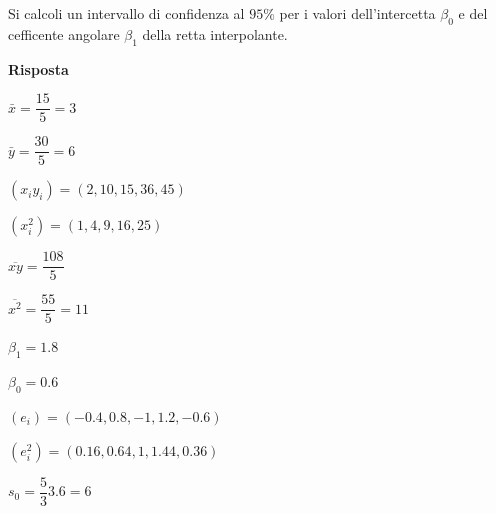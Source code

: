 \documentclass[11pt,openany]{book}
\begin{document}
Si calcoli un intervallo di confidenza al $95\%$ per i valori dell'intercetta $\beta_0$ e del cefficente angolare $\beta_1$ della retta interpolante.

\textbf{Risposta}

$\bar x=\dfrac{15}{5}=3$

$\bar y=\dfrac{30}{5}=6$

$(x_iy_i) = (2, 10, 15, 36, 45)$

$(x_i^2) = (1,  4,  9, 16, 25)$

$\overline{xy}=\dfrac{108}{5}$

$\overline{x^2}=\dfrac{55}{5}=11$


$\beta_1=1.8$

$\beta_0=0.6$

$(e_i)=( -0.4,  0.8, -1,  1.2, -0.6)$

$(e_i^2)=(0.16, 0.64, 1, 1.44, 0.36)$

$s_0=\dfrac{5}{3}3.6=6$

\end{document}
